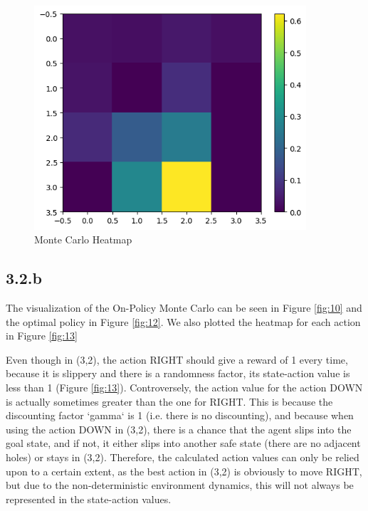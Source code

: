 \documentclass{article} %
\begin{document}
	\begin{figure}[h!]
		\centering
		\includegraphics[width=0.9\textwidth]{images/3.2a.png}
		\caption{Monte Carlo Heatmap}
		\label{fig:9}
	\end{figure}
	
	\subsection{3.2.b}
	
	The visualization of the On-Policy Monte Carlo can be seen in Figure \ref{fig:10} and the optimal policy in Figure \ref{fig:12}. We also plotted the heatmap for each action in Figure \ref{fig:13}
	
	Even though in (3,2), the action RIGHT should give a reward of 1 every time, because it is slippery and there is a randomness factor, its state-action value is less than 1 (Figure \ref{fig:13}).
	Controversely, the action value for the action DOWN is actually sometimes greater than the one for RIGHT. This is because the discounting factor `gamma` is 1 (i.e. there is no discounting), and because when using the action DOWN in (3,2), there is a chance that the agent slips into the goal state, and if not, it either slips into another safe state (there are no adjacent holes) or stays in (3,2).
	Therefore, the calculated action values can only be relied upon to a certain extent, as the best action in (3,2) is obviously to move RIGHT, but due to the non-deterministic environment dynamics, this will not always be represented in the state-action values.
	
\end{document}
